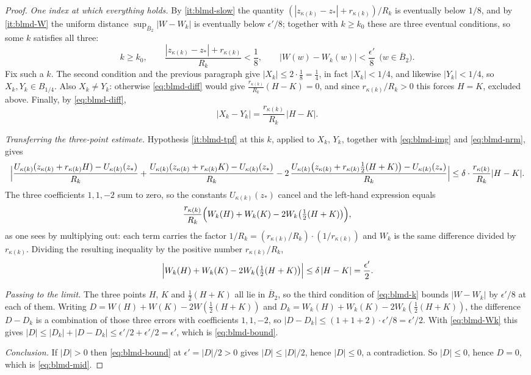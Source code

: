 \begin{proof}
\emph{One index at which everything holds.} By \ref{it:blmd-slow} the quantity
$(|z_{\kappa(k)}-z_*|+r_{\kappa(k)})/R_k$ is eventually below $1/8$, and by
\ref{it:blmd-W} the uniform distance $\sup_{\overline B_2}|W-W_k|$ is
eventually below $\epsilon'/8$; together with $k\ge k_0$ these are three
eventual conditions, so some $k$ satisfies all three:
\begin{equation}\label{eq:blmd-k}
  k\ge k_0,\qquad
  \frac{|z_{\kappa(k)}-z_*|+r_{\kappa(k)}}{R_k}<\frac18,\qquad
  |W(w)-W_k(w)|<\frac{\epsilon'}8\ \ \bigl(w\in\overline B_2\bigr).
\end{equation}
Fix such a $k$. The second condition and the previous paragraph give
$|X_k|\le2\cdot\tfrac18=\tfrac14$, in fact $|X_k|<1/4$, and likewise
$|Y_k|<1/4$, so $X_k,Y_k\in B_{1/4}$. Also $X_k\ne Y_k$: otherwise
\eqref{eq:blmd-diff} would give $\frac{r_{\kappa(k)}}{R_k}(H-K)=0$, and since
$r_{\kappa(k)}/R_k>0$ this forces $H=K$, excluded above. Finally, by
\eqref{eq:blmd-diff},
\begin{equation}\label{eq:blmd-nrm}
  |X_k-Y_k|=\frac{r_{\kappa(k)}}{R_k}\,|H-K| .
\end{equation}

\emph{Transferring the three-point estimate.} Hypothesis \ref{it:blmd-tpf} at
this $k$, applied to $X_k$, $Y_k$, together with \eqref{eq:blmd-img} and
\eqref{eq:blmd-nrm}, gives
\[
  \Bigl|\frac{U_{\kappa(k)}(z_{\kappa(k)}+r_{\kappa(k)}H)-U_{\kappa(k)}(z_*)}{R_k}
   +\frac{U_{\kappa(k)}(z_{\kappa(k)}+r_{\kappa(k)}K)-U_{\kappa(k)}(z_*)}{R_k}
   -2\,\frac{U_{\kappa(k)}\bigl(z_{\kappa(k)}+r_{\kappa(k)}\tfrac12(H+K)\bigr)
             -U_{\kappa(k)}(z_*)}{R_k}\Bigr|
  \le\delta\cdot\frac{r_{\kappa(k)}}{R_k}|H-K| .
\]
The three coefficients $1,1,-2$ sum to zero, so the constants
$U_{\kappa(k)}(z_*)$ cancel and the left-hand expression equals
\[
  \frac{r_{\kappa(k)}}{R_k}
  \Bigl(W_k(H)+W_k(K)-2W_k\bigl(\tfrac12(H+K)\bigr)\Bigr),
\]
as one sees by multiplying out: each term carries the factor
$1/R_k=(r_{\kappa(k)}/R_k)\cdot(1/r_{\kappa(k)})$ and $W_k$ is the same
difference divided by $r_{\kappa(k)}$. Dividing the resulting inequality by the
positive number $r_{\kappa(k)}/R_k$,
\begin{equation}\label{eq:blmd-Wk}
  \Bigl|W_k(H)+W_k(K)-2W_k\bigl(\tfrac12(H+K)\bigr)\Bigr|
  \le\delta\,|H-K|=\frac{\epsilon'}2 .
\end{equation}

\emph{Passing to the limit.} The three points $H$, $K$ and $\tfrac12(H+K)$ all
lie in $\overline B_2$, so the third condition of \eqref{eq:blmd-k} bounds
$|W-W_k|$ by $\epsilon'/8$ at each of them. Writing
$D=W(H)+W(K)-2W(\tfrac12(H+K))$ and
$D_k=W_k(H)+W_k(K)-2W_k(\tfrac12(H+K))$, the difference $D-D_k$ is a
combination of those three errors with coefficients $1,1,-2$, so
$|D-D_k|\le(1+1+2)\cdot\epsilon'/8=\epsilon'/2$. With \eqref{eq:blmd-Wk} this
gives $|D|\le|D_k|+|D-D_k|\le\epsilon'/2+\epsilon'/2=\epsilon'$, which is
\eqref{eq:blmd-bound}.

\emph{Conclusion.} If $|D|>0$ then \eqref{eq:blmd-bound} at
$\epsilon'=|D|/2>0$ gives $|D|\le|D|/2$, hence $|D|\le0$, a contradiction.
So $|D|\le0$, hence $D=0$, which is \eqref{eq:blmd-mid}.
\end{proof}
